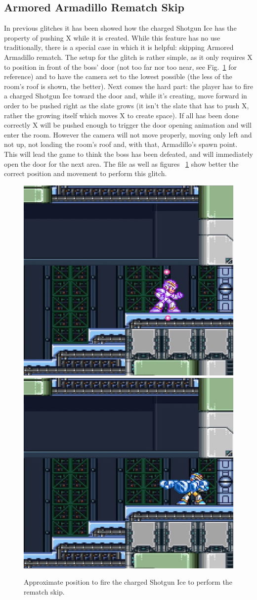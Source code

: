\subsection{Armored Armadillo Rematch Skip}\label{Armadillo_skip}
In previous glitches it has been showed how the charged Shotgun Ice has the property of pushing X while it is created. While this feature has no use traditionally, there is a special case in which it is helpful: skipping Armored Armadillo rematch. The setup for the glitch is rather simple, as it only requires X to position in front of the boss' door (not too far nor too near, see Fig.~\ref{Armadillo_skip_positioning} for reference) and to have the camera set to the lowest possible (the less of the room's roof is shown, the better). Next comes the hard part: the player has to fire a charged Shotgun Ice toward the door and, while it's creating, move forward in order to be pushed right as the slate grows (it isn't the slate that has to push X, rather the growing itself which moves X to create space). If all has been done correctly X will be pushed enough to trigger the door opening animation and will enter the room. However the camera will not move properly, moving only left and not up, not loading the room's roof and, with that, Armadillo's spawn point. This will lead the game to think the boss has been defeated, and will immediately open the door for the next area. The file  as well as figures ~\ref{Armadillo_skip_positioning} show better the correct position and movement to perform this glitch.
\begin{figure}[htp]
	\centering
	\includegraphics[width=0.45\linewidth]{figures/X1/Miscs/Dillo_skip_1.jpg}
	\includegraphics[width=0.45\linewidth]{figures/X1/Miscs/Dillo_skip_2.jpg}
	\caption{Approximate position to fire the charged Shotgun Ice to perform the rematch skip.}
	\label{Armadillo_skip_positioning}
\end{figure}
